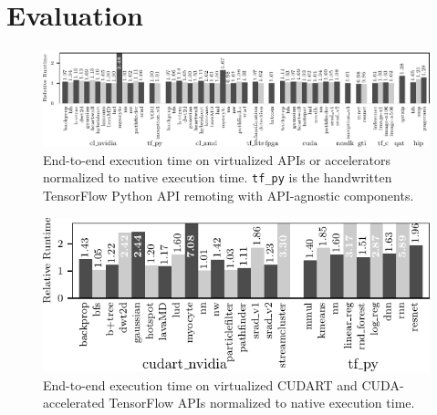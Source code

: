 
\section{Evaluation}
\label{s:eval}

\begin{figure}
  \centering
	\includegraphics[width=\textwidth]{ava/data/end2end/end2end_all.pdf}
    \vspace{-1.75em}
	\caption{End-to-end execution time on virtualized APIs or accelerators normalized to native execution time. \lstinline|tf_py| is the handwritten TensorFlow Python API remoting with \AvA API-agnostic components.}
	\label{fig:end2end}
\end{figure}

\begin{figure}
	\centering
	\includegraphics[width=\columnwidth]{ava/data/end2end/end2end_cudart.pdf}%
	\vspace*{-.1em}
	\caption{End-to-end execution time on virtualized CUDART and CUDA-accelerated TensorFlow APIs normalized to native execution time.}
	\label{fig:end2end_cudart}
\end{figure}

